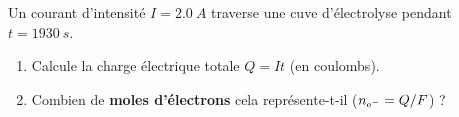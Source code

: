 \documentclass[11pt,a4paper]{article}
\newcounter{exo}
\begin{document}
\begin{exo}
Un courant d'intensité $I=\SI{2.0}{A}$ traverse une cuve d'électrolyse pendant $t=\SI{1930}{s}$.
\begin{enumerate}[label=(\alph*),leftmargin=2em,topsep=1pt,itemsep=1pt]
  \item Calcule la charge électrique totale $Q=It$ (en coulombs).
  \item Combien de \textbf{moles d'électrons} cela représente-t-il ($n_{\ce{e^-}}=Q/F$) ?
\end{enumerate}
\end{exo}
\end{document}
